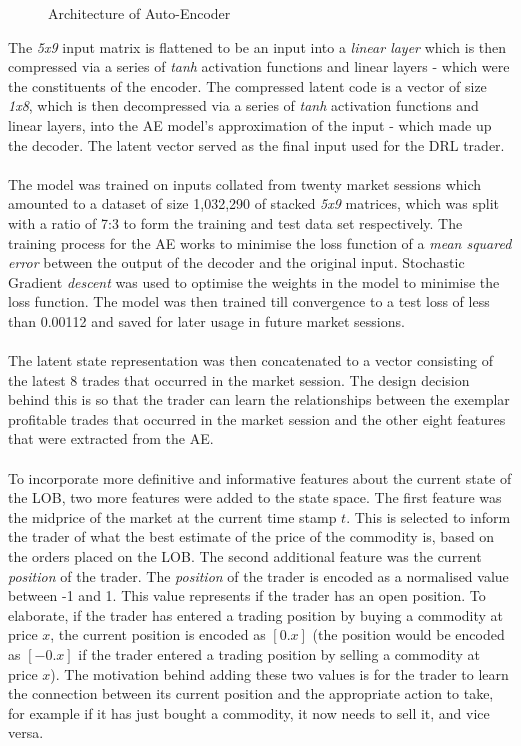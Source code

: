 \documentclass[ %
                    author={Ashwinder Khurana},
                supervisor={Prof Dave Cliff},
                    degree={MEng},
                     title={The Deeply Reinforced Trader},
                  subtitle={},
                      type={enterprise},
                      year={2020} ]{dissertation}
\begin{document}
{\begin{figure}[H]
{  \caption{Architecture of Auto-Encoder}
  }
\label{fig:AE-arch}  
\end{figure}
\noindent 
The \textit{5x9} input matrix is flattened to be an input into a \textit{linear layer} which is then compressed via a series of \textit{tanh} activation functions and linear layers - which were the constituents of the encoder. The compressed latent code is a vector of size \textit{1x8}, which is then decompressed via a series of \textit{tanh} activation functions and linear layers, into the AE model's approximation of the input - which made up the decoder. The latent vector served as the final input used for the DRL trader.
\\
\\
The model was trained on inputs collated from twenty market sessions which amounted to a dataset of size 1,032,290 of stacked \textit{5x9} matrices, which was split with a ratio of 7:3 to form the training and test data set respectively. The training process for the AE works to minimise the loss function of a \textit{mean squared error} between the output of the decoder and the original input. Stochastic Gradient \textit{descent} was used to optimise the weights in the model to minimise the loss function. The model was then trained till convergence to a test loss of less than 0.00112 and saved for later usage in future market sessions. 
\\
\\
The latent state representation was then concatenated to a vector consisting of the latest 8 trades that occurred in the market session. The design decision behind this is so that the trader can learn the relationships between the exemplar profitable trades that occurred in the market session and the other eight features that were extracted from the AE. 
\\
\\
To incorporate more definitive and informative features about the current state of the LOB, two more features were added to the state space. The first feature was the midprice of the market at the current time stamp $t$. This is selected to inform the trader of what the best estimate of the price of the commodity is, based on the orders placed on the LOB. The second additional feature was the current \textit{position} of the trader. The \textit{position} of the trader is encoded as a normalised value between -1 and 1. This value represents if the trader has an open position. To elaborate, if the trader has entered a trading position by  buying a commodity at price $x$, the current position is encoded as $[0.x]$ (the position would be encoded as $[-0.x]$ if the trader entered a trading position by selling a commodity at price $x$). The motivation behind adding these two values is for the trader to learn the connection between its current position and the appropriate action to take, for example if it has just bought a commodity, it now needs to sell it, and vice versa. 
}
\end{document}
